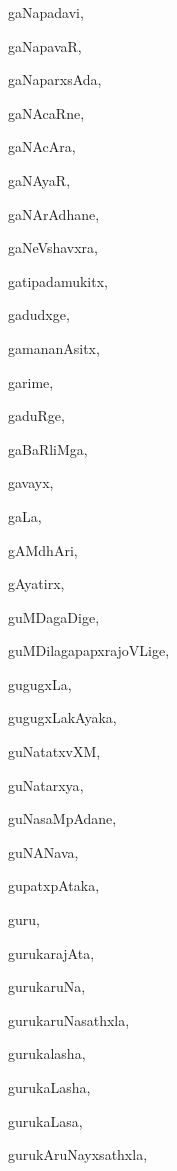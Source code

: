 \begin{multicols}{2}
{gaNapadavi}, \pageref{gaNapadavi}

{gaNapavaR}, \pageref{gaNapavaR}

{gaNaparxsAda}, \pageref{gaNaparxsAda}

{gaNAcaRne}, \pageref{gaNAcaRne}

{gaNAcAra}, \pageref{gaNAcAra}

{gaNAyaR}, \pageref{gaNAyaR}

{gaNArAdhane}, \pageref{gaNArAdhane}

{gaNeVshavxra}, \pageref{gaNeVshavxra}

{gatipadamukitx}, \pageref{gatipadamukitx}

{gadudxge}, \pageref{gadudxge}

{gamananAsitx}, \pageref{gamananAsitx}

{garime}, \pageref{garime}

{gaduRge}, \pageref{gaduRge}

{gaBaRliMga}, \pageref{gaBaRliMga}

{gavayx}, \pageref{gavayx}

{gaLa}, \pageref{gaLa}

{gAMdhAri}, \pageref{gAMdhAri}

{gAyatirx}, \pageref{gAyatirx}

{guMDagaDige}, \pageref{guMDagaDige}

{guMDilagapapxrajoVLige}, \pageref{guMDilagapapxrajoVLige}

{gugugxLa}, \pageref{gugugxLa}

{gugugxLakAyaka}, \pageref{gugugxLakAyaka}

{guNatatxvXM}, \pageref{guNatatxvXM}

{guNatarxya}, \pageref{guNatarxya}

{guNasaMpAdane}, \pageref{guNasaMpAdane}

{guNANava}, \pageref{guNANava}

{gupatxpAtaka}, \pageref{gupatxpAtaka}

{guru}, \pageref{guru}

{gurukarajAta}, \pageref{gurukarajAta}

{gurukaruNa}, \pageref{gurukaruNa}

{gurukaruNasathxla}, \pageref{gurukaruNasathxla}

{gurukalasha}, \pageref{gurukalasha}

{gurukaLasha}, \pageref{gurukaLasha}

{gurukaLasa}, \pageref{gurukaLasa}

{gurukAruNayxsathxla}, \pageref{gurukAruNayxsathxla}


\end{multicols}
